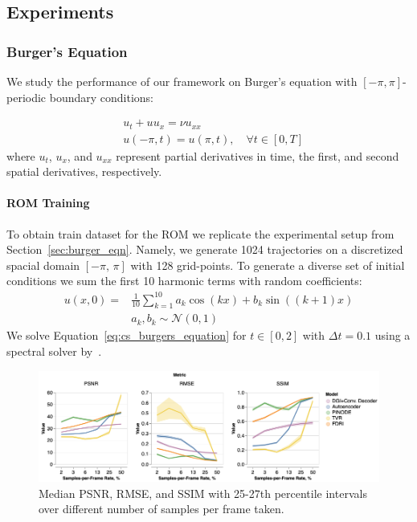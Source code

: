 \subsection{Experiments}

\subsubsection{Burger's Equation}
We study the performance of our framework on Burger's equation with $[-\pi, \pi]$-periodic boundary conditions:

\begin{equation}
\begin{split}
\label{eq:cs_burgers_equation}
    & u_t  + uu_x = \nu u_{xx} \\
    & u(-\pi, t) = u(\pi, t),\quad \forall t \in [0, T]
\end{split}
\end{equation}
where $u_t$, $u_x$, and $u_{xx}$ represent partial derivatives in time, the first, and second spatial derivatives, respectively. 

\paragraph{ROM Training} To obtain train dataset for the ROM we replicate the experimental setup from Section~\ref{sec:burger_eqn}. Namely, we generate 1024 trajectories on a discretized spacial domain $[-\pi,\,\pi]$ with 128 grid-points. To generate a diverse set of initial conditions we sum the first 10 harmonic terms with random coefficients:
\begin{equation}
    \label{eq:burger_initial_condition_sine}
    \begin{split}
        u(x, 0) = & \frac{1}{10}\sum_{k = 1}^{10} a_k\cos(kx) + b_k\sin((k+1)x)\\ & a_k, b_k \sim \mathcal{N}(0, 1)
    \end{split}
\end{equation}
 We solve Equation~\ref{eq:cs_burgers_equation} for $t \in [0, 2]$ with $\Delta t = 0.1$ using a spectral solver by~\citep{trefethen2000spectral}. 

\begin{figure}[t]
    \centering
    \includegraphics[width=\textwidth]{figures/cs_burgers_psnr.png}
    \caption{\label{fig:cs_burgers_spf} Median PSNR, RMSE, and SSIM with 25-27th percentile intervals over different number of samples per frame taken.}
\end{figure}

